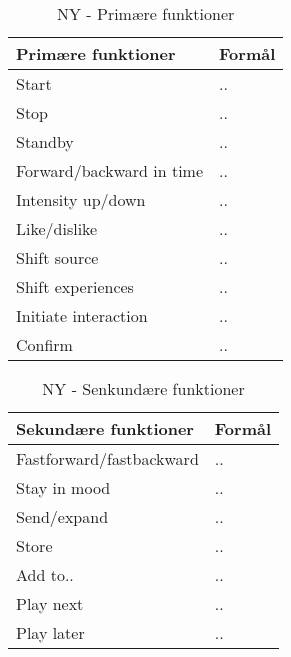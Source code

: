 %
\begin{table}[H]
\centering
\begin{tabular}{|l|l|}
\hline
\multicolumn{1}{|l|}{\textbf{Primære funktioner}} & \multicolumn{1}{l|}{\textbf{Formål}} \\ \hline
Start & .. \\ \hline
Stop & .. \\ \hline
Standby & .. \\ \hline
Forward/backward in time & .. \\ \hline
Intensity up/down & .. \\ \hline
Like/dislike & .. \\ \hline
Shift source & .. \\ \hline
Shift experiences & .. \\ \hline
Initiate interaction & .. \\ \hline
Confirm & .. \\ \hline
\end{tabular}
\caption{NY - Primære funktioner}
\label{tab:BogOsPrimaereFunktioner}
\end{table}
\noindent
%

%
\begin{table}[H]
\centering
\begin{tabular}{|l|l|}
\hline
\multicolumn{1}{|l|}{\textbf{Sekundære funktioner}} & \multicolumn{1}{l|}{\textbf{Formål}} \\ \hline
Fastforward/fastbackward & .. \\ \hline
Stay in mood & .. \\ \hline
Send/expand & .. \\ \hline
Store & .. \\ \hline
Add to.. & .. \\ \hline
Play next & .. \\ \hline
Play later & .. \\ \hline
\end{tabular}
\caption{NY - Senkundære funktioner}
\label{tab:BogOsSekundaereFunktioner}
\end{table}
\noindent
%

